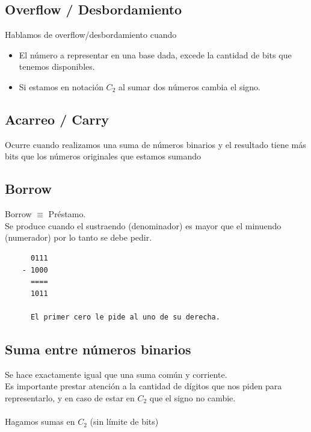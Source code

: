 \documentclass[10pt,a4paper]{article}
\begin{document}
\subsection*{Overflow / Desbordamiento}
Hablamos de overflow/desbordamiento cuando 
\begin{itemize}
    \item\label{item:overflow1} El número a representar en una base dada, excede la cantidad de bits que tenemos disponibles.
    \item\label{item:overflow2} Si estamos en notación \(C_{2}\) al sumar dos números cambia el signo.
\end{itemize} 


\subsection*{Acarreo / Carry}
Ocurre cuando realizamos una suma de números binarios y el resultado tiene más bits que los números originales que estamos sumando

\subsection*{Borrow}
Borrow \(\equiv\) Préstamo. \\
Se produce cuando el sustraendo (denominador) es mayor que el minuendo (numerador) por lo tanto se debe pedir.

\begin{lstlisting}
      0111
    - 1000
      ====
      1011

      El primer cero le pide al uno de su derecha.
\end{lstlisting}

\subsection*{Suma entre números binarios}
Se hace exactamente igual que una suma común y corriente. \\
Es importante prestar atención a la cantidad de dígitos que nos piden para representarlo, y en caso de estar en \(C_{2}\) que el signo no cambie.\\ 
\\
Hagamos sumas en \(C_{2}\) (sin límite de bits)
\end{document}
